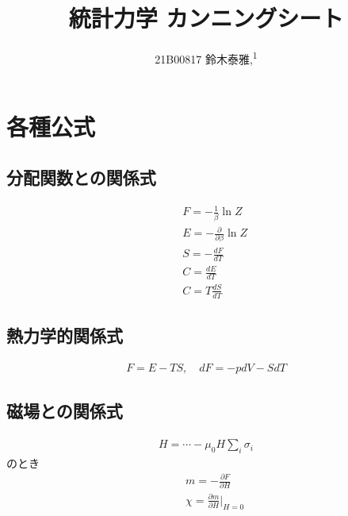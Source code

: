 \documentclass[12pt,dvipdfmx]{jsarticle}
\newcommand\authormark[1]{\textsuperscript{#1}}
\begin{document}
\title{統計力学 カンニングシート}

\author{21B00817 鈴木泰雅,\authormark{1}}
\section*{\Large{各種公式}}
\subsection*{分配関数との関係式}
\begin{eqnarray}
  &&F = -\frac{1}{\beta}\ln Z\\
  &&E = -\frac{\partial}{\partial\beta}\ln Z\\
  &&S = -\frac{dF}{dT}\\
  &&C = \frac{dE}{dT}\\
  &&C = T\frac{dS}{dT}
\end{eqnarray}
\subsection*{熱力学的関係式}
\begin{eqnarray}
  F = E-TS,\quad dF = -pdV -SdT 
\end{eqnarray}
\subsection*{磁場との関係式}
\begin{eqnarray}
  H = \cdots - \mu_0H\sum_i \sigma_i
\end{eqnarray}
のとき
\begin{eqnarray}
  &&m= -\frac{\partial F}{\partial H}\\
  &&\chi = \frac{\partial m}{\partial H}|_{H=0}
\end{eqnarray}
\end{document}
